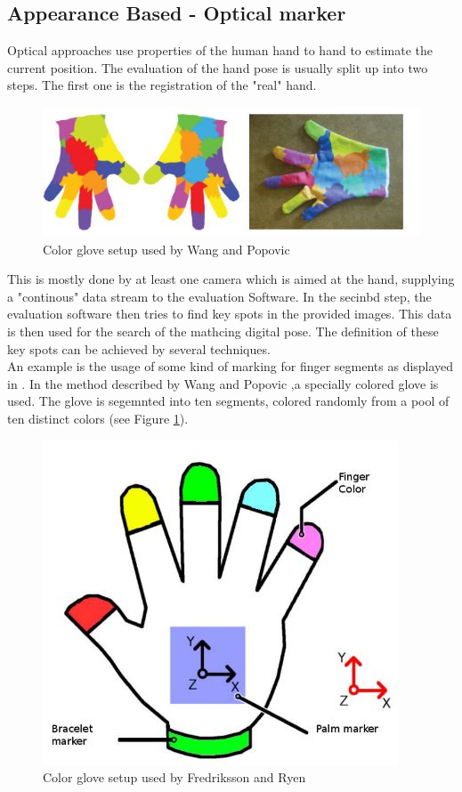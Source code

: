 \subsection{Appearance Based - Optical marker}
\label{Appearance Based Optical marker}
Optical approaches use properties of the human hand to hand to estimate the current position. The evaluation of the hand pose is usually split up into two steps. The first one is the registration of the "real" hand.\\
\begin{figure}
\includegraphics[scale=0.61]{images/wang_color_glove.JPG}
\caption{Color glove setup used by Wang and Popovic \cite{Wang.2009} }
\label{wang color glove}
\end{figure}
This is mostly done by at least one camera which is aimed at the hand, supplying a "continous" data stream to the evaluation Software. In the secinbd step, the evaluation software then tries to find key spots in the provided images. This data is then used for the search of the mathcing digital pose. The definition of these key spots can be achieved by several techniques.\\
An example is the usage of some kind of marking for finger segments as displayed in \cite{Duca.2007,Fredriksson.2008,Wang.2009}.
In the method described by Wang and Popovic \cite{Wang.2009},a specially colored glove is used. The glove is segemnted into ten segments, colored randomly from a pool of ten distinct colors (see Figure \ref{wang color glove}).

\begin{figure}
\includegraphics[scale=0.61]{images/fredrikkson_color_glove.JPG}
\caption{Color glove setup used by Fredriksson and Ryen \cite{Fredriksson.2008} }
\label{Fredriksson color glove}
\end{figure}

